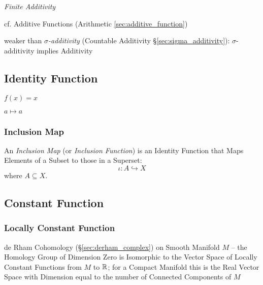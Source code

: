 \emph{Finite Additivity}

cf. Additive Functions (Arithmetic \ref{sec:additive_function})

weaker than \emph{$\sigma$-additivity} (Countable Additivity
\S\ref{sec:sigma_additivity}): $\sigma$-additivity implies Additivity



\subsection{Identity Function}\label{sec:identity_function}

$f(x) = x$

$a \mapsto a$



\subsubsection{Inclusion Map}\label{sec:inclusion_map}

An \emph{Inclusion Map} (or \emph{Inclusion Function}) is an Identity
Function that Maps Elements of a Subset to those in a Superset:
\[
  \iota : A \hookrightarrow X
\]
where $A \subseteq X$.



\subsection{Constant Function}\label{sec:constant_function}

\subsubsection{Locally Constant Function}\label{sec:locally_constant}

\fist de Rham Cohomology (\S\ref{sec:derham_complex}) on Smooth Manifold $M$ --
the Homology Group of Dimension Zero is Isomorphic to the Vector Space of
Locally Constant Functions from $M$ to $\mathbb{R}$; for a Compact Manifold this is
the Real Vector Space with Dimension equal to the number of Connected Components
of $M$



